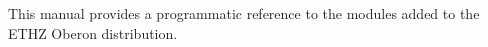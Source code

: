 
This manual provides a programmatic reference to the modules added to
the ETHZ Oberon distribution.
